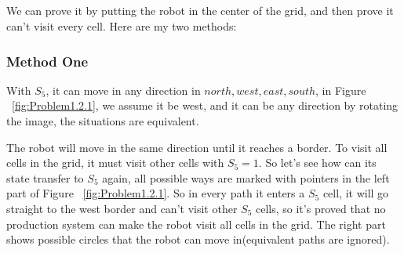 \documentclass[paper=a4, fontsize=11pt]{scrartcl} %
\numberwithin{equation}{section} %
\numberwithin{figure}{section} %
\numberwithin{table}{section} %
\begin{document}

\subsection{}

We can prove it by putting the robot in the center of the grid, 
and then prove it can't visit every cell. Here are my two methods:\\

\subsubsection{Method One}

With $S_5$, it can move in any direction in ${north, west, east, south}$, 
in Figure ~\ref{fig:Problem1.2.1}, 
we assume it be west, and it can be any direction by rotating the image, 
the situations are equivalent.

The robot will move in the same direction until it reaches a border.
To visit all cells in the grid, it must visit other cells with $S_5=1$.
So let's see how can its state transfer to $S_5$ again,
all possible ways are marked with pointers in the left part of Figure ~\ref{fig:Problem1.2.1}.
So in every path it enters a $S_5$ cell, it will go straight to the west border and 
can't visit other $S_5$ cells, so it's proved that no production system 
can make the robot visit all cells in the grid.
The right part shows possible circles that the robot can move in(equivalent paths are ignored).\\
    
\end{document}
